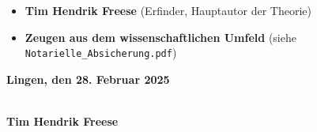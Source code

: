 \documentclass[a4paper,12pt]{article}
\begin{document}
\begin{itemize}
    \item \textbf{Tim Hendrik Freese} (Erfinder, Hauptautor der Theorie)
    \item \textbf{Zeugen aus dem wissenschaftlichen Umfeld} (siehe \texttt{Notarielle\_Absicherung.pdf})
\end{itemize}

\vspace{1cm}

\begin{flushright}
    \textbf{Lingen, den 28. Februar 2025}
    
    \vspace{1cm}
    \makebox[3in]{\hrulefill} \\
    \textbf{Tim Hendrik Freese}
\end{flushright}
\end{document}
